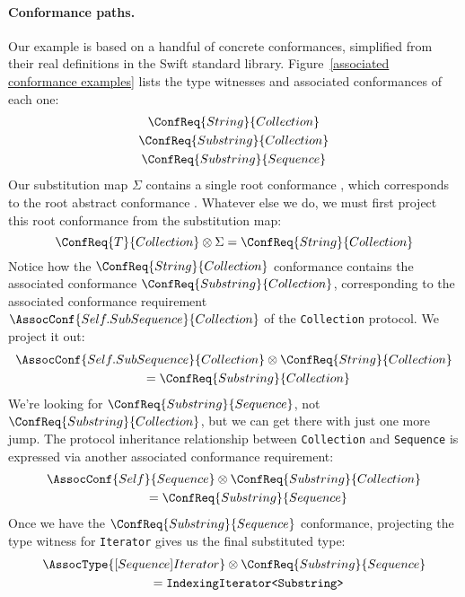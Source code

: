 \documentclass[../generics]{subfiles}
\begin{document}
\paragraph{Conformance paths.} Our example is based on a handful of concrete conformances, simplified from their real definitions in the Swift standard library. Figure~\ref{associated conformance examples} lists the type witnesses and associated conformances of each one:
\begin{gather*}
\ConfReq{String}{Collection}\\
\ConfReq{Substring}{Collection}\\
\ConfReq{Substring}{Sequence}
\end{gather*}
Our substitution map $\Sigma$ contains a single root conformance , which corresponds to the root abstract conformance . Whatever else we do, we must first project this root conformance from the substitution map:
\[
\ConfReq{T}{Collection} \otimes \Sigma = \ConfReq{String}{Collection}
\]
Notice how the $\ConfReq{String}{Collection}$ conformance contains the associated conformance $\ConfReq{Substring}{Collection}$, corresponding to the associated conformance requirement $\AssocConf{Self.SubSequence}{Collection}$ of the \verb|Collection| protocol. We project it out:
\begin{gather*}
\AssocConf{Self.SubSequence}{Collection} \otimes \ConfReq{String}{Collection}\\
\qquad {} = \ConfReq{Substring}{Collection}
\end{gather*}
We're looking for $\ConfReq{Substring}{Sequence}$, not $\ConfReq{Substring}{Collection}$, but we can get there with just one more jump. The protocol inheritance relationship between \texttt{Collection} and \texttt{Sequence} is expressed via another associated conformance requirement:
\begin{gather*}
\AssocConf{Self}{Sequence} \otimes \ConfReq{Substring}{Collection}\\
\qquad {} = \ConfReq{Substring}{Sequence}
\end{gather*}
Once we have the $\ConfReq{Substring}{Sequence}$ conformance, projecting the type witness for \verb|Iterator| gives us the final substituted type:
\begin{gather*}
\AssocType{[Sequence]Iterator}\otimes \ConfReq{Substring}{Sequence}\\
\qquad {} = \texttt{IndexingIterator<Substring>}
\end{gather*}
\end{document}

